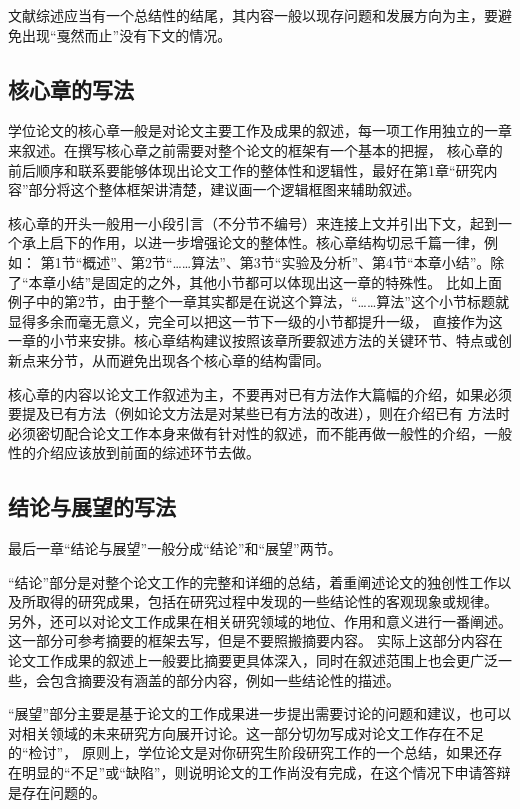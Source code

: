 文献综述应当有一个总结性的结尾，其内容一般以现存问题和发展方向为主，要避免出现“戛然而止”没有下文的情况。

\subsection{核心章的写法}

学位论文的核心章一般是对论文主要工作及成果的叙述，每一项工作用独立的一章来叙述。在撰写核心章之前需要对整个论文的框架有一个基本的把握，
核心章的前后顺序和联系要能够体现出论文工作的整体性和逻辑性，最好在第1章“研究内容”部分将这个整体框架讲清楚，建议画一个逻辑框图来辅助叙述。

核心章的开头一般用一小段引言（不分节不编号）来连接上文并引出下文，起到一个承上启下的作用，以进一步增强论文的整体性。核心章结构切忌千篇一律，例如：
第1节“概述”、第2节“……算法”、第3节“实验及分析”、第4节“本章小结”。除了“本章小结”是固定的之外，其他小节都可以体现出这一章的特殊性。
比如上面例子中的第2节，由于整个一章其实都是在说这个算法，“……算法”这个小节标题就显得多余而毫无意义，完全可以把这一节下一级的小节都提升一级，
直接作为这一章的小节来安排。核心章结构建议按照该章所要叙述方法的关键环节、特点或创新点来分节，从而避免出现各个核心章的结构雷同。

核心章的内容以论文工作叙述为主，不要再对已有方法作大篇幅的介绍，如果必须要提及已有方法（例如论文方法是对某些已有方法的改进），则在介绍已有
方法时必须密切配合论文工作本身来做有针对性的叙述，而不能再做一般性的介绍，一般性的介绍应该放到前面的综述环节去做。

\subsection{结论与展望的写法}

最后一章“结论与展望”一般分成“结论”和“展望”两节。

“结论”部分是对整个论文工作的完整和详细的总结，着重阐述论文的独创性工作以及所取得的研究成果，包括在研究过程中发现的一些结论性的客观现象或规律。
另外，还可以对论文工作成果在相关研究领域的地位、作用和意义进行一番阐述。这一部分可参考摘要的框架去写，但是不要照搬摘要内容。
实际上这部分内容在论文工作成果的叙述上一般要比摘要更具体深入，同时在叙述范围上也会更广泛一些，会包含摘要没有涵盖的部分内容，例如一些结论性的描述。

“展望”部分主要是基于论文的工作成果进一步提出需要讨论的问题和建议，也可以对相关领域的未来研究方向展开讨论。这一部分切勿写成对论文工作存在不足的“检讨”，
原则上，学位论文是对你研究生阶段研究工作的一个总结，如果还存在明显的“不足”或“缺陷”，则说明论文的工作尚没有完成，在这个情况下申请答辩是存在问题的。
